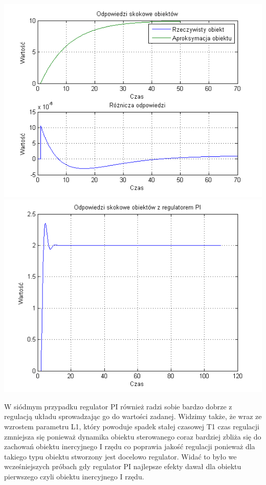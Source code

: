 \documentclass[10pt,a4paper]{article}
\begin{document}
\begin{center}
\includegraphics[scale=1]{images/jeden/skrypt_223.png}\\
\includegraphics[scale=1]{images/jeden/skrypt_224.png}\\
\end{center}
\newpage
W siódmym przypadku regulator PI również radzi sobie bardzo dobrze z regulacją układu sprowadzając go do wartości zadanej. Widzimy także, że wraz ze wzrostem parametru L1, który powoduje spadek stałej czasowej T1 czas regulacji zmniejsza się ponieważ dynamika obiektu sterowanego coraz bardziej zbliża się do zachowań obiektu inercyjnego I rzędu co poprawia jakość regulacji ponieważ dla takiego typu obiektu stworzony jest docelowo regulator. Widać to było we wcześniejszych próbach gdy regulator PI najlepsze efekty dawał dla obiektu pierwszego czyli obiektu inercyjnego I rzędu.
\newpage
\end{document}
